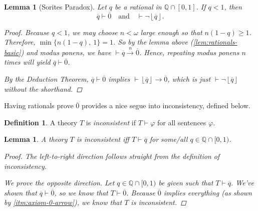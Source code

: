 \documentclass{amsart}
\newtheorem{lemma}[theorem]{Lemma}
\theoremstyle{definition}
\newtheorem{definition}[theorem]{Definition}
\numberwithin{equation}{theorem}
\renewcommand{\phi}{\varphi}
\newcommand{\Q}{\mathbb{Q}}
\newcommand{\proves}{\vdash}
\newcommand{\strict}[1]{{\left\lfloor#1\right\rfloor}}
\newcommand{\rat}[1]{{\overline{#1}}}
\newcommand{\narrow}[1]{\xrightarrow{#1}}
\renewcommand{\to}{\narrow{}}
\begin{document}
\begin{lemma}[Sorites Paradox]
  Let $q$ be a rational in $\Q\cap[0,1]$.
  If $q<1$, then 
  \[
    \rat q\proves\rat 0\quad\text{and}\quad\proves\neg\strict{\rat q}.
  \]
  \begin{proof}
    Because $q<1$, we may choose $n<\omega$ large enough so that $n(1-q)\geq 1$.
    Therefore, $\min\{n(1-q),\ 1\}=1$.
    So by the lemma above (\ref{lem:rationals-basic}) and modus ponens, we have $\proves\rat q\narrow n\rat 0$.
    Hence, repeating modus ponens $n$ times will yield $\rat q\proves\rat 0$.
    
    By the Deduction Theorem, $\rat q\proves\rat 0$ implies $\proves\strict{\rat q}\to\rat 0$, which is just $\proves\neg\strict{\rat q}$ without the shorthand.
  \end{proof}
\end{lemma}

Having rationals prove $\rat 0$ provides a nice segue into inconsistency, defined below.
\begin{definition}
  A theory $T$ is \emph{inconsistent} if $T\proves\phi$ for all sentences $\phi$.
\end{definition}
\begin{lemma}\label{lem:alt-def-inconsistency}
  A theory $T$ is inconsistent iff $T\proves\rat q$ for some/all $q\in\Q\cap[0,1)$.
  \begin{proof}
    The left-to-right direction follows straight from the definition of inconsistency.
    
    We prove the opposite direction.
    Let $q\in\Q\cap[0,1)$ be given such that $T\proves\rat q$.
    We've shown that $\rat q\proves\rat 0$, so we know that $T\proves\rat 0$.
    Because $\rat 0$ implies everything (as shown by \ref{itm:axiom-0-arrow}), we know that $T$ is inconsistent.
  \end{proof}
\end{lemma}
\end{document}
